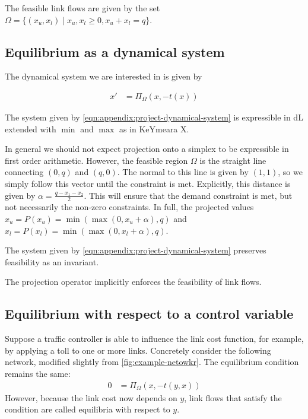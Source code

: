 The feasible link flows are given by the set $\Omega = \{ (x_u, x_l) \mid x_u, x_l \geq 0, x_u +x_l = q\}$.

\subsection{Equilibrium as a dynamical system}

The dynamical system we are interested in is given by 

\begin{align}
    x' &= \Pi_{\Omega}(x, -t(x))\label{eqn:appendix:project-dynamical-system}
\end{align}

\begin{remark}[Expressible in dL]
\label{remark:dl-expression}
The system given by \eqref{eqn:appendix:project-dynamical-system} is expressible in dL extended with $\min$ and $\max$ as in KeYmeara X.
\end{remark}

In general we should not expect projection onto a simplex to be expressible in first order arithmetic.
However, the feasible region $\Omega$ is the straight line connecting $(0, q)$ and $(q, 0)$. 
The normal to this line is given by $(1, 1)$, so we simply follow this vector until the constraint is met.
Explicitly, this distance is given by $\alpha = \frac{q-x_1-x_2}{2}$.
This will ensure that the demand constraint is met, but not necessarily the non-zero constraints. 
In full, the projected values $\hat{x}_u = P(x_u) = \min(\max(0, x_u+\alpha), q)$ and $\hat{x}_l = P(x_l) = \min(\max(0, x_l+\alpha), q)$.

\begin{remark}
The system given by \eqref{eqn:appendix:project-dynamical-system} preserves feasibility as an invariant.
\end{remark}

The projection operator implicitly enforces the feasibility of link flows.\\

\subsection{Equilibrium with respect to a control variable}

Suppose a traffic controller is able to influence the link cost function, for example, by applying a toll to one or more links.
Concretely consider the following network, modified slightly from \cref{fig:example-netowkr}.
The equilibrium condition remains the same: 
\begin{align}
    0&= \Pi_{\Omega}(x, -t(y, x))\label{eqn:appendex:equilibrium-wrt-y}
\end{align}
However, because the link cost now depends on $y$, link flows that satisfy the condition are called equilibria with respect to $y$.

